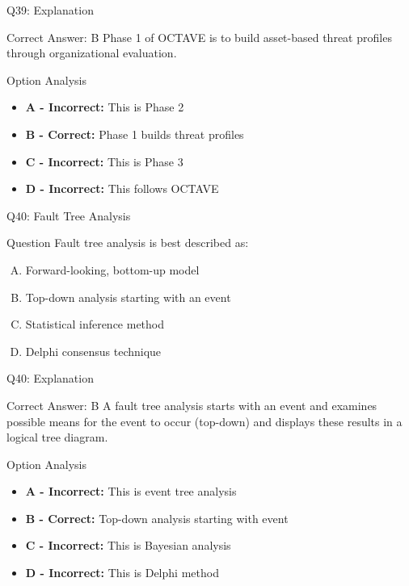 \documentclass{beamer}
\begin{document}
	\begin{frame}{Q39: Explanation}
		\begin{block}{Correct Answer: B}
			Phase 1 of OCTAVE is to build asset-based threat profiles through organizational evaluation.
		\end{block}
		\begin{block}{Option Analysis}
			\begin{itemize}
				\item \textbf{A - Incorrect:} This is Phase 2
				\item \textbf{B - Correct:} Phase 1 builds threat profiles
				\item \textbf{C - Incorrect:} This is Phase 3
				\item \textbf{D - Incorrect:} This follows OCTAVE
			\end{itemize}
		\end{block}
	\end{frame}
	
	\begin{frame}{Q40: Fault Tree Analysis}
		\begin{block}{Question}
			Fault tree analysis is best described as:
		\end{block}
		\begin{enumerate}[(A)]
			\item Forward-looking, bottom-up model
			\item Top-down analysis starting with an event
			\item Statistical inference method
			\item Delphi consensus technique
		\end{enumerate}
	\end{frame}
	
	\begin{frame}{Q40: Explanation}
		\begin{block}{Correct Answer: B}
			A fault tree analysis starts with an event and examines possible means for the event to occur (top-down) and displays these results in a logical tree diagram.
		\end{block}
		\begin{block}{Option Analysis}
			\begin{itemize}
				\item \textbf{A - Incorrect:} This is event tree analysis
				\item \textbf{B - Correct:} Top-down analysis starting with event
				\item \textbf{C - Incorrect:} This is Bayesian analysis
				\item \textbf{D - Incorrect:} This is Delphi method
			\end{itemize}
		\end{block}
	\end{frame}
	
\end{document}
